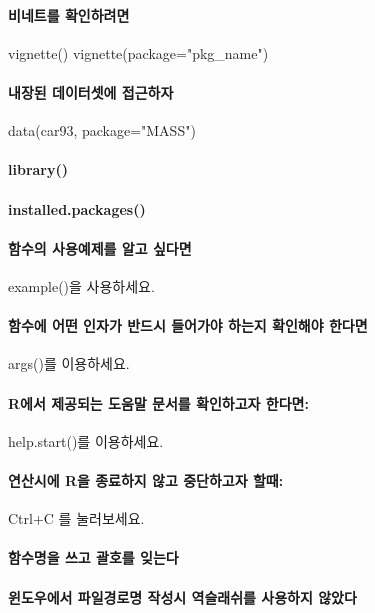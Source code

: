 \paragraph{비네트를 확인하려면 }  
vignette()
vignette(package="pkg_{name}")
\paragraph{내장된 데이터셋에 접근하자} data(car93, package="MASS")
\paragraph{library()}
\paragraph{installed.packages()}
\paragraph{함수의 사용예제를 알고 싶다면 } example()을 사용하세요. 
\paragraph{함수에 어떤 인자가 반드시 들어가야 하는지 확인해야 한다면}  args()를 이용하세요.
\paragraph{R에서 제공되는 도움말 문서를 확인하고자 한다면:} help.start()를 이용하세요.
\paragraph{연산시에 R을 종료하지 않고 중단하고자 할때:}  Ctrl+C 를 눌러보세요.

\paragraph{함수명을 쓰고 괄호를 잊는다}
\paragraph{윈도우에서 파일경로명 작성시 역슬래쉬를 사용하지 않았다}
